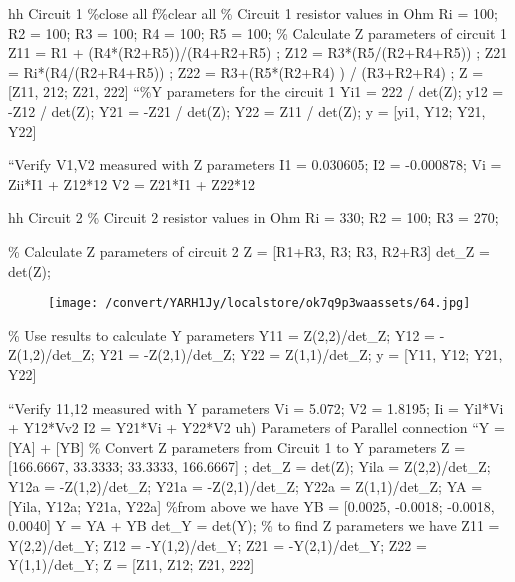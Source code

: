 \documentclass[12pt]{report}
\begin{document}
\vspace{10pt}

    hh Circuit 1   \%close all   f\%clear all   \% Circuit 1 resistor values in Ohm  Ri = 100;    R2 = 100;  R3 = 100;  R4 = 100;  R5 = 100;    \% Calculate Z parameters of circuit 1  Z11 = R1 + (R4*(R2+R5))/(R4+R2+R5) ;  Z12 = R3*(R5/(R2+R4+R5)) ;   Z21 = Ri*(R4/(R2+R4+R5)) ;   Z22 = R3+(R5*(R2+R4) ) / (R3+R2+R4) ;   Z = [Z11, 212; Z21, 222]   “\%Y parameters for the circuit 1  Yi1 = 222 / det(Z);   y12 = -Z12 / det(Z);   Y21 = -Z21 / det(Z);   Y22 = Z11 / det(Z);   y = [yi1, Y12; Y21, Y22] 

\vspace{10pt}

    “Verify V1,V2 measured with Z parameters  I1 = 0.030605;   I2 = -0.000878;   Vi = Zii*I1 + Z12*12   V2 = Z21*I1 + Z22*12 

\vspace{10pt}

    hh Circuit 2   \% Circuit 2 resistor values in Ohm  Ri = 330;   R2 = 100;   R3 = 270; 

\vspace{10pt}

    \% Calculate Z parameters of circuit 2  Z = [R1+R3, R3; R3, R2+R3]  det\_Z = det(Z); 

\vspace{10pt}

\begin{figure}[h]

\texttt{[image: /convert/YARH1Jy/localstore/ok7q9p3waassets/64.jpg]}

\centering

\end{figure}

\par

\vspace{10pt}

    \% Use results to calculate Y parameters  Y11 = Z(2,2)/det\_Z;   Y12 = -Z(1,2)/det\_Z;   Y21 = -Z(2,1)/det\_Z;   Y22 = Z(1,1)/det\_Z;   y = [Y11, Y12; Y21, Y22] 

\vspace{10pt}

    “Verify 11,12 measured with Y parameters  Vi = 5.072;   V2 = 1.8195;   Ii = Yil*Vi + Y12*Vv2   I2 = Y21*Vi + Y22*V2   uh) Parameters of Parallel connection   “Y = [YA] + [YB]   \% Convert Z parameters from Circuit 1 to Y parameters  Z = [166.6667, 33.3333; 33.3333, 166.6667] ;  det\_Z = det(Z);   Yila = Z(2,2)/det\_Z;   Y12a = -Z(1,2)/det\_Z;   Y21a = -Z(2,1)/det\_Z;   Y22a = Z(1,1)/det\_Z;   YA = [Yila, Y12a; Y21a, Y22a]   \%from above we have   YB = [0.0025, -0.0018; -0.0018, 0.0040]  Y = YA + YB   det\_Y = det(Y);   \% to find Z parameters we have   Z11 = Y(2,2)/det\_Y;   Z12 = -Y(1,2)/det\_Y;   Z21 = -Y(2,1)/det\_Y;   Z22 = Y(1,1)/det\_Y;   Z = [Z11, Z12; Z21, 222] 
\end{document}
